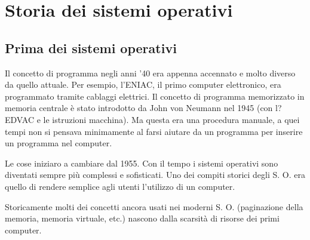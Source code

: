 \chapter{Storia dei sistemi operativi}

\section{Prima dei sistemi operativi}

Il concetto di programma negli anni '40 era appenna accennato e molto
diverso da quello attuale. Per esempio, l'ENIAC, il primo computer
elettronico, era programmato tramite cablaggi elettrici. Il concetto di
programma memorizzato in memoria centrale è stato introdotto da John
von Neumann nel 1945 (con l?EDVAC e le istruzioni macchina).
Ma questa era una procedura manuale, a quei tempi non si pensava minimamente
al farsi aiutare da un programma per inserire un programma nel computer.


Le cose iniziaro a cambiare dal 1955. Con il tempo i sistemi operativi sono diventati sempre
più complessi e sofisticati. Uno dei compiti storici degli S. O. era quello di rendere 
semplice agli utenti l'utilizzo di un computer.

Storicamente molti dei concetti ancora usati nei moderni S. O. (paginazione della memoria,
memoria virtuale, etc.) nascono dalla scarsità di risorse dei primi computer.

